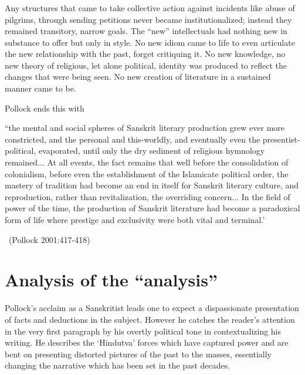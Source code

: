 \subsubsection{} Any structures that came to take collective action against incidents like abuse of pilgrims, through sending petitions never became institutionalized; instead they remained transitory, narrow goals. The “new” intellectuals had nothing new in substance to offer but only in style. No new idiom came to life to even articulate the new relationship with the past, forget critiquing it. No new knowledge, no new theory of religious, let alone political, identity was produced to reflect the changes that were being seen. No new creation of literature in a sustained manner came to be. 

Pollock ends this with 

\begin{myquote}
\eleven
“the mental and social spheres of Sanskrit literary production grew ever more constricted, and the personal and this-worldly, and eventually even the presentist-political, evaporated, until only the dry sediment of religious hymnology remained... At all events, the fact remains that well before the consolidation of colonialism, before even the establishment of the Islamicate political order, the mastery of tradition had become an end in itself for Sanskrit literary culture, and reproduction, rather than revitalization, the overriding concern... In the field of power of the time, the production of Sanskrit literature had become a paradoxical form of life where prestige and exclusivity were both vital and terminal.’
\vskip -5pt

~\hfill(Pollock 2001:417-418)
\end{myquote}
\vskip -40pt

\section{Analysis of the “analysis”}
\vskip -5pt

Pollock’s acclaim as a Sanskritist leads one to expect a dispassionate presentation of facts and deductions in the subject. However he catches the reader’s attention in the very first paragraph by his overtly political tone in contextualizing his writing. He describes the ‘Hindutva’ forces which have captured power and are bent on presenting distorted pictures of the past to the masses, essentially changing the narrative which has been set in the past decades. 

